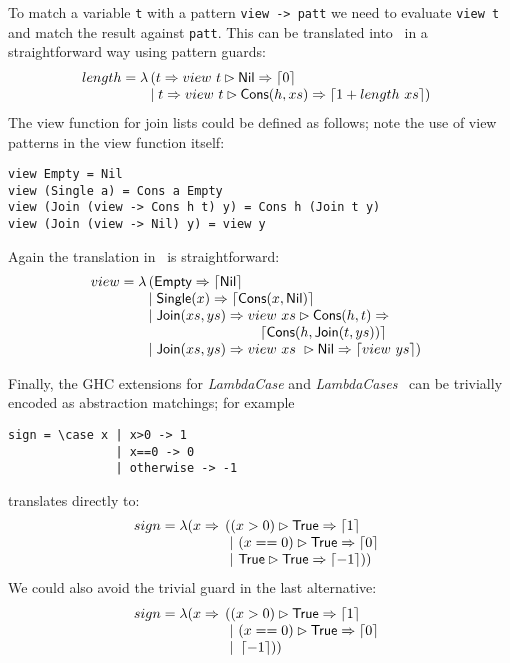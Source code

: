 To match a variable \texttt{t} with a pattern \verb|view -> patt|
we need to evaluate \verb|view t| and match the result against \verb|patt|.
This can be translated into \lambdaPMC\ in a straightforward way
using pattern guards:
\[
  length = \lambda \!\!\begin{array}[t]{l}
                     (t \Rightarrow view~t \rhd 
      \textsf{Nil} \Rightarrow \left\lceil 0\right\rceil \\
      \mid t \Rightarrow view~t \rhd \textsf{Cons}(h,xs) \Rightarrow \left\lceil 1+length~ xs\right\rceil)
    \end{array} \\
\]
The view function for join lists could be defined as follows; note the use
of view patterns in the view function itself:
\begin{verbatim}
view Empty = Nil
view (Single a) = Cons a Empty
view (Join (view -> Cons h t) y) = Cons h (Join t y)
view (Join (view -> Nil) y) = view y
\end{verbatim}
Again the translation in \lambdaPMC\ is straightforward:
\[
  view = \lambda\!\!
  \begin{array}[t]{l}
    (\textsf{Empty} \Rightarrow \left\lceil \textsf{Nil}\right\rceil \\
    \mid \textsf{Single}(x) \Rightarrow \left\lceil \textsf{Cons}(x,\textsf{Nil})\right\rceil \\
    \mid \textsf{Join}(xs,ys) \Rightarrow view~xs \rhd 
    \textsf{Cons}(h,t) \Rightarrow \\
    \qquad \qquad\qquad\qquad \left\lceil \textsf{Cons}(h,\textsf{Join}(t,ys))\right\rceil \\
    \mid \textsf{Join}(xs,ys) \Rightarrow view~xs ~ \rhd
    \textsf{Nil} \Rightarrow \left\lceil view~ys\right\rceil)
  \end{array}
\]

Finally, the GHC extensions for \emph{LambdaCase} and
\emph{LambdaCases}~\cite{ghc_guide_lambda_case} can be trivially
encoded as abstraction matchings; for example
\begin{verbatim}
sign = \case x | x>0 -> 1
               | x==0 -> 0
               | otherwise -> -1
\end{verbatim}
translates directly to:
\[ sign = \lambda (x \Rightarrow \!\!\begin{array}[t]{l}
  ((x>0) \rhd  \textsf{True} \Rightarrow \left\lceil 1\right\rceil \\
  ~|~ (x==0)\rhd \textsf{True} \Rightarrow \left\lceil 0\right\rceil\\
  ~|~ \textsf{True} \rhd \textsf{True} \Rightarrow  \left\lceil -1\right\rceil ))
 \end{array}    
\]
%
We could also avoid the trivial guard in the last alternative:
%
\[ sign = \lambda (x \Rightarrow \!\!\begin{array}[t]{l}
  ((x>0) \rhd  \textsf{True} \Rightarrow \left\lceil 1\right\rceil \\
  ~|~ (x==0)\rhd \textsf{True} \Rightarrow \left\lceil 0\right\rceil\\
  ~|~  \left\lceil -1\right\rceil ))
 \end{array}    
\]
  


